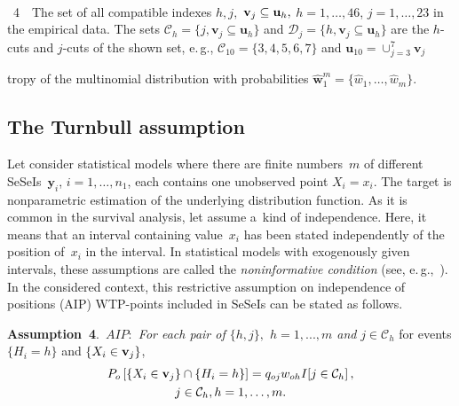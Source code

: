 \begin{multicols}{2}
 \pagebreak
 
 \begin{center}  %
\vspace*{1pt}
\mbox{%
 \epsfxsize=74.792mm
 }

\end{center}


\noindent
{{\figurename~4}\ \ \small{The set of all compatible indexes $h, j,$ 
 $ \mathbf{v}_j \subseteq {\bf u}_h, $ $h=1, \ldots , 46$, $j=1,
\ldots , 23$ in the empirical data. The sets $\mathcal{C}_h =
\{ j, \mathbf{v}_j \subseteq \mathbf{u}_h \}$ and $ \mathcal{D}_j=\{ h, 
\mathbf{v}_j \subseteq \mathbf{u}_h \}$ are the $h$-cuts and $j$-cuts of the
shown set, e.\,g., $\mathcal{C}_{10} =\{ 3, 4, 5, 6, 7\}$ and $\mathbf{u}_{10} =
\cup_{j=3}^7 \mathbf{v}_j$}}

\vspace*{9pt}

\addtocounter{figure}{1}
 

\noindent
tropy of the multinomial
distribution with probabilities $ \hat{\mathbf{w}}_1^m=\{ \hat w_1, \ldots, 
\hat w_m \}.$


\subsection{The Turnbull assumption}

\noindent
Let consider statistical models where there are  finite numbers~$m$
of different SeSeIs~$\mathbf{y}_i$, $i=1, \ldots, n_1$, each
contains one unobserved point $X_i=x_i.$ 
The target is nonparametric estimation of the underlying
distribution function. As it is common in the survival analysis, let assume a~kind of
independence. Here, it means that an interval containing value~$x_i$ has been stated
independently of the position of~$x_i$ in the interval.  In statistical models with
exogenously given intervals, these assumptions are called  the \textit{noninformative condition}
(see, e.\,g.,~\cite{BK:GCO04, BK:GCOL09}).
 In the considered context, this  restrictive assumption  on independence of positions (AIP) WTP-points
 included in SeSeIs can be stated as  follows.
 
 \noindent
 \textbf{Assumption~4}.\
\textit{$AIP: $ For each  pair of $\{ h, j\} ,$ $ h=1, ..., m $ and}
$ j\in\mathcal{C}_h$ for events $\{ H_i =h\}$ and $\{ X_i \in {\bf v}_j\}$,
\begin{multline*}
P_o \left[ \left\{ X_i \in {\bf v}_j\right\} \cap \{ H_i =h\}\right] =
q_{oj}w_{oh} I [j\in \mathcal{C}_h ]\,,\\
j\in\mathcal{C}_h, h=1, \ldots, m.
\end{multline*}



\end{multicols}
